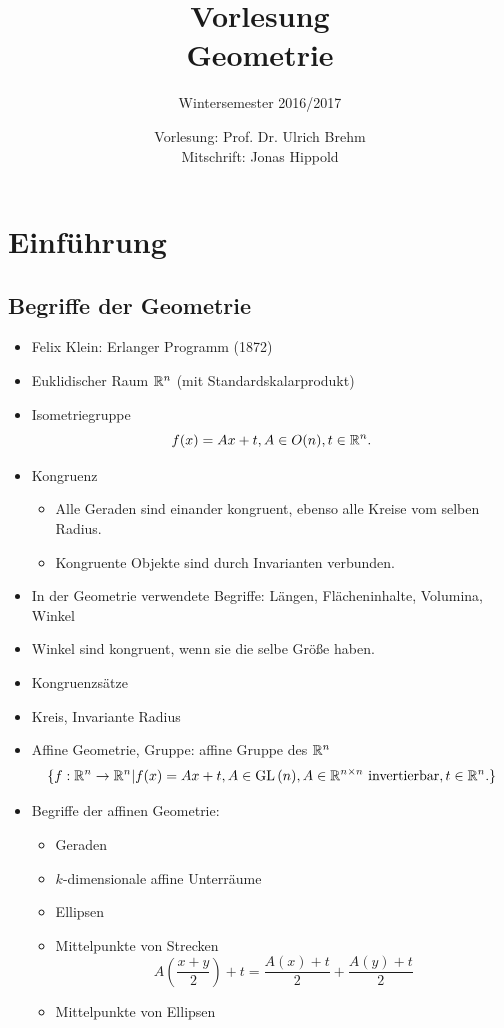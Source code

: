 \documentclass[
 a4paper,
 12pt,
 parskip=half
 ]{scrartcl}
\title{Vorlesung\\Geometrie}
\subtitle{Wintersemester 2016/2017}
\author{Vorlesung: Prof. Dr. Ulrich Brehm\\Mitschrift: Jonas Hippold}
\theoremstyle{plain}
\theoremstyle{definition}
\begin{document}
\maketitle

\tableofcontents

\setcounter{secnumdepth}{0}
\section{Einführung}
\subsection{Begriffe der Geometrie}
\begin{itemize}
 \item Felix Klein: Erlanger Programm (1872)
 \item Euklidischer Raum $\mathbb{R}^n$ (mit Standardskalarprodukt)
 \item Isometriegruppe
  \[ f(x) = Ax + t, A \in O(n), t \in \mathbb{R}^n. \]
 \item Kongruenz
  \begin{itemize} 
   \item Alle Geraden sind einander kongruent, ebenso alle Kreise vom selben Radius.
   \item Kongruente Objekte sind durch Invarianten verbunden.
  \end{itemize}
 \item In der Geometrie verwendete Begriffe: Längen, Flächeninhalte, Volumina, Winkel
 \item Winkel sind kongruent, wenn sie die selbe Größe haben.
 \item Kongruenzsätze
 \item Kreis, Invariante Radius
 \item Affine Geometrie, Gruppe: affine Gruppe des $\mathbb{R}^n$
  \[ \{ f: \mathbb{R}^n \to \mathbb{R}^n | f(x) = Ax + t, A \in \mathrm{GL}\,(n), A \in \mathbb{R}^{n \times n} \text{ invertierbar}, t \in \mathbb{R}^n. \} \]
 \item Begriffe der affinen Geometrie:
  \begin{itemize}
   \item Geraden
   \item $k$-dimensionale affine Unterräume
   \item Ellipsen
   \item Mittelpunkte von Strecken 
    \[ A \left( \frac{x+y}{2} \right) + t = \frac{A(x) + t}{2} + \frac{A(y) + t}{2} \]
   \item Mittelpunkte von Ellipsen
  \end{itemize}

\end{itemize}
\end{document}
